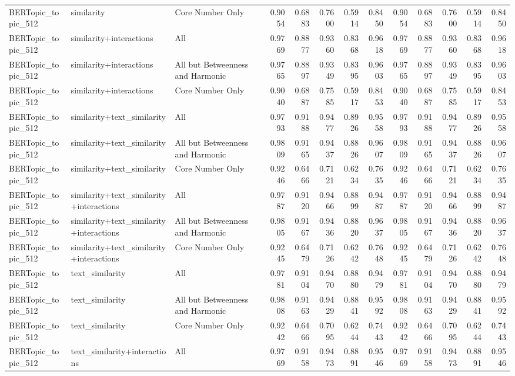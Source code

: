 \begin{tabular}{lllrrrrrrrrrr}
BERTopic_topic_512 & similarity & Core Number Only & 0.9054 & 0.6883 & 0.7600 & 0.5914 & 0.8450 & 0.9054 & 0.6883 & 0.7600 & 0.5914 & 0.8450 \\
BERTopic_topic_512 & similarity+interactions & All & 0.9769 & 0.8877 & 0.9360 & 0.8368 & 0.9618 & 0.9769 & 0.8877 & 0.9360 & 0.8368 & 0.9618 \\
BERTopic_topic_512 & similarity+interactions & All but Betweenness and Harmonic & 0.9765 & 0.8897 & 0.9349 & 0.8395 & 0.9603 & 0.9765 & 0.8897 & 0.9349 & 0.8395 & 0.9603 \\
BERTopic_topic_512 & similarity+interactions & Core Number Only & 0.9040 & 0.6887 & 0.7585 & 0.5917 & 0.8453 & 0.9040 & 0.6887 & 0.7585 & 0.5917 & 0.8453 \\
BERTopic_topic_512 & similarity+text_similarity & All & 0.9793 & 0.9188 & 0.9477 & 0.8926 & 0.9558 & 0.9793 & 0.9188 & 0.9477 & 0.8926 & 0.9558 \\
BERTopic_topic_512 & similarity+text_similarity & All but Betweenness and Harmonic & 0.9809 & 0.9165 & 0.9437 & 0.8826 & 0.9607 & 0.9809 & 0.9165 & 0.9437 & 0.8826 & 0.9607 \\
BERTopic_topic_512 & similarity+text_similarity & Core Number Only & 0.9246 & 0.6466 & 0.7121 & 0.6234 & 0.7635 & 0.9246 & 0.6466 & 0.7121 & 0.6234 & 0.7635 \\
BERTopic_topic_512 & similarity+text_similarity+interactions & All & 0.9787 & 0.9120 & 0.9466 & 0.8899 & 0.9487 & 0.9787 & 0.9120 & 0.9466 & 0.8899 & 0.9487 \\
BERTopic_topic_512 & similarity+text_similarity+interactions & All but Betweenness and Harmonic & 0.9805 & 0.9167 & 0.9436 & 0.8820 & 0.9637 & 0.9805 & 0.9167 & 0.9436 & 0.8820 & 0.9637 \\
BERTopic_topic_512 & similarity+text_similarity+interactions & Core Number Only & 0.9245 & 0.6479 & 0.7126 & 0.6242 & 0.7648 & 0.9245 & 0.6479 & 0.7126 & 0.6242 & 0.7648 \\
BERTopic_topic_512 & text_similarity & All & 0.9781 & 0.9104 & 0.9470 & 0.8880 & 0.9479 & 0.9781 & 0.9104 & 0.9470 & 0.8880 & 0.9479 \\
BERTopic_topic_512 & text_similarity & All but Betweenness and Harmonic & 0.9808 & 0.9163 & 0.9429 & 0.8841 & 0.9592 & 0.9808 & 0.9163 & 0.9429 & 0.8841 & 0.9592 \\
BERTopic_topic_512 & text_similarity & Core Number Only & 0.9242 & 0.6466 & 0.7095 & 0.6244 & 0.7443 & 0.9242 & 0.6466 & 0.7095 & 0.6244 & 0.7443 \\
BERTopic_topic_512 & text_similarity+interactions & All & 0.9769 & 0.9158 & 0.9473 & 0.8891 & 0.9546 & 0.9769 & 0.9158 & 0.9473 & 0.8891 & 0.9546 \\

\end{tabular}
